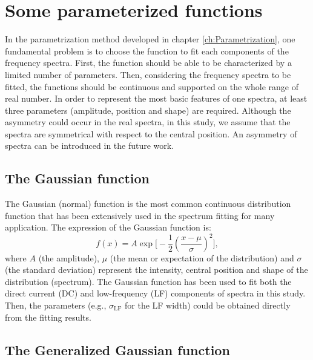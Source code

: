 
\chapter{Some parameterized functions} \label{appB}

\graphicspath{{AppendixB_ys/}}


In the parametrization method developed in chapter \ref{ch:Parametrization}, one fundamental problem is to choose the function to fit each components of the frequency spectra. First, the function should be able to be characterized by a limited number of parameters. Then, considering the frequency spectra to be fitted, the functions should be continuous and supported on the whole range of real number. In order to represent the most basic features of one spectra, at least three parameters (amplitude, position and shape) are required. Although the asymmetry could occur in the real spectra, in this study, we assume that the spectra are symmetrical with respect to the central position. An asymmetry of spectra can be introduced in the future work.  


\section*{The Gaussian function}


The Gaussian (normal) function is the most common continuous distribution function that has been extensively used in the spectrum fitting for many application. The expression of the Gaussian function is:%
\begin{equation}
f(x) = A\exp\biggl[-\frac{1}{2}\left(\frac{x-\mu}{\sigma}\right)^2\biggr],
\label{eq:GD}
\end{equation}
\noindent where $A$ (the amplitude), $\mu$ (the mean or expectation of the distribution) and $\sigma$ (the standard deviation) represent the intensity, central position and shape of the distribution (spectrum). The Gaussian function has been used to fit both the direct current (DC) and low-frequency (LF) components of spectra in this study. Then, the parameters (e.g., $\sigma_\mathrm{LF}$ for the LF width) could be obtained directly from the fitting results. 


\section*{The Generalized Gaussian function}



